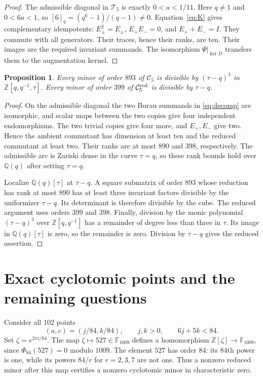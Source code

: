 \documentclass[11pt,a4paper]{article}
\newtheorem{proposition}[theorem]{Proposition}
\newcommand{\Q}{\mathbb Q}
\newcommand{\Z}{\mathbb Z}
\newcommand{\F}{\mathbb F}
\newcommand{\Tcal}{\mathcal T}
\begin{document}
\begin{proof}
The admissible diagonal in $\Tcal_5$ is exactly $0<a<1/11$.
Here $q\ne1$ and $0<6a<1$, so $[6]_q=(q^6-1)/(q-1)\ne0$.
Equation~\eqref{eq:K} gives complementary idempotents:
$E_\pm^2=E_\pm$, $E_+E_-=0$, and $E_++E_-=I$.
They commute with all generators. Their traces, hence their ranks,
are ten. Their images are the required invariant summands.
The isomorphism $\Psi|_{\ker D}$ transfers them to the augmentation
kernel.
\end{proof}

\begin{proposition}\label{prop:factor}
Every minor of order $893$ of $\mathcal C_5$ is divisible by
$(\tau-q)^3$ in $\Z[q,q^{-1},\tau]$. Every minor of order $399$
of $\mathcal C^{\rm red}_5$ is divisible by $\tau-q$.
\end{proposition}

\begin{proof}
On the admissible diagonal the two Burau summands in
\eqref{eq:decomp} are isomorphic, and scalar maps between the two
copies give four independent endomorphisms. The two trivial copies
give four more, and $E_+,E_-$ give two. Hence the ambient commutant
has dimension at least ten and the reduced commutant at least two.
Their ranks are at most $890$ and $398$, respectively.
The admissible arc is Zariski dense in the curve $\tau=q$, so these
rank bounds hold over $\Q(q)$ after setting $\tau=q$.

Localize $\Q(q)[\tau]$ at $\tau-q$. A square submatrix of order
$893$ whose reduction has rank at most $890$ has at least three
invariant factors divisible by the uniformizer $\tau-q$. Its
determinant is therefore divisible by the cube. The reduced argument
uses orders $399$ and $398$. Finally, division by the monic polynomial
$(\tau-q)^3$ over $\Z[q,q^{-1}]$ has a remainder of degree less
than three in $\tau$. Its image in $\Q(q)[\tau]$ is zero, so the
remainder is zero. Division by $\tau-q$ gives the reduced assertion.
\end{proof}

\section{Exact cyclotomic points and the remaining questions}

Consider all $102$ points
\[
 (a,c)=(j/84,k/84),\qquad j,k>0,\qquad 6j+5k<84.
\]
Set $\zeta=e^{2\pi i/84}$. The map $\zeta\mapsto527\in\F_{1009}$
defines a homomorphism $\Z[\zeta]\to\F_{1009}$, since
$\Phi_{84}(527)=0$ modulo $1009$.
The element $527$ has order $84$: its $84$th power is one, while
its powers $84/r$ for $r=2,3,7$ are not one.
Thus a nonzero reduced minor after this map certifies a nonzero
cyclotomic minor in characteristic zero.
\end{document}
